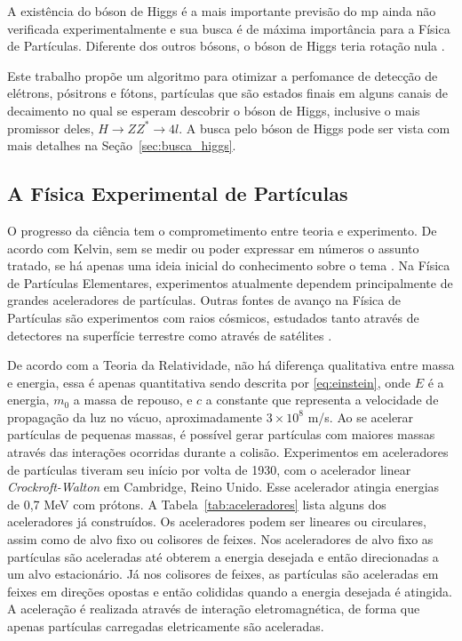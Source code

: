A existência do bóson de Higgs é a mais importante previsão do \gls{mp} 
ainda não verificada experimentalmente e sua busca é de máxima importância para
a Física de Partículas. Diferente dos outros bósons, o
bóson de Higgs teria rotação nula \cite{Intro_Nuclear}.

Este trabalho propõe um algoritmo para otimizar a perfomance de detecção de
elétrons, pósitrons e fótons, partículas que são estados finais em alguns canais de
decaimento no qual se esperam descobrir o bóson de Higgs, inclusive o mais promissor
deles, $H\rightarrow ZZ^*\rightarrow 4l$. 
A busca pelo bóson de Higgs pode ser vista com mais detalhes na Seção~\ref{sec:busca_higgs}.

\subsection{A Física Experimental de Partículas}
\label{ssec:fisexp}

O progresso da ciência tem o comprometimento entre teoria e experimento. De
acordo com Kelvin, sem se medir ou poder expressar em números o assunto tratado, 
se há apenas uma ideia inicial do conhecimento sobre o tema \cite{kelvin}. 
Na Física de Partículas Elementares, experimentos atualmente dependem
principalmente de grandes aceleradores de partículas. Outras fontes de avanço na
Física de Partículas são experimentos com raios cósmicos, estudados tanto
através de detectores na superfície terrestre como através de satélites 
\cite{nature_space_and_time}. 

De acordo com a Teoria da Relatividade, não há diferença qualitativa entre
massa e energia, essa é apenas quantitativa \cite{einstein} sendo descrita por
\ref{eq:einstein}, onde $E$ é a energia, $m_0$ a massa de repouso, e $c$ a constante que representa a
velocidade de propagação da luz no vácuo, aproximadamente $3\times10^{8}$ m/s. Ao se acelerar
partículas de pequenas massas, é possível gerar partículas com maiores massas
através das interações ocorridas durante a colisão. Experimentos em
aceleradores de partículas tiveram seu início por volta de 1930, com o
acelerador linear \emph{Crockroft-Walton} em Cambridge, Reino Unido. Esse
acelerador atingia energias de 0,7 MeV com prótons. A Tabela~\ref{tab:aceleradores} 
lista alguns dos aceleradores já construídos. Os
aceleradores podem ser lineares ou circulares, assim como de alvo fixo ou colisores
de feixes. Nos aceleradores de alvo fixo as partículas são aceleradas até
obterem a energia desejada e então direcionadas a um alvo estacionário. Já nos
colisores de feixes, as partículas são aceleradas em feixes em direções
opostas e então colididas quando a energia desejada é atingida. A aceleração é
realizada através de interação eletromagnética, de forma que apenas
partículas carregadas eletricamente são aceleradas.


